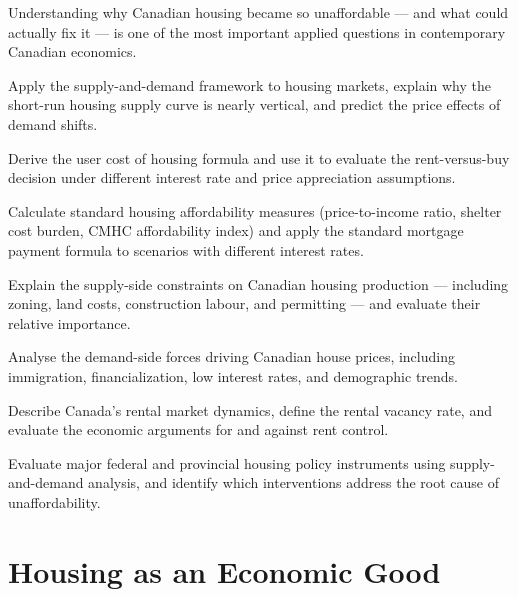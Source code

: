Understanding why Canadian housing became so unaffordable --- and what
could actually fix it --- is one of the most important applied questions
in contemporary Canadian economics.


\begin{learningobjectives}
  \item Apply the supply-and-demand framework to housing markets,
        explain why the short-run housing supply curve is nearly vertical,
        and predict the price effects of demand shifts.
  \item Derive the user cost of housing formula and use it to evaluate
        the rent-versus-buy decision under different interest rate and
        price appreciation assumptions.
  \item Calculate standard housing affordability measures (price-to-income
        ratio, shelter cost burden, CMHC affordability index) and apply
        the standard mortgage payment formula to scenarios with different
        interest rates.
  \item Explain the supply-side constraints on Canadian housing
        production --- including zoning, land costs, construction labour,
        and permitting --- and evaluate their relative importance.
  \item Analyse the demand-side forces driving Canadian house prices,
        including immigration, financialization, low interest rates, and
        demographic trends.
  \item Describe Canada's rental market dynamics, define the rental
        vacancy rate, and evaluate the economic arguments for and against
        rent control.
  \item Evaluate major federal and provincial housing policy instruments
        using supply-and-demand analysis, and identify which interventions
        address the root cause of unaffordability.
\end{learningobjectives}

\section{Housing as an Economic Good}
\label{sec:housing_economic_good}

